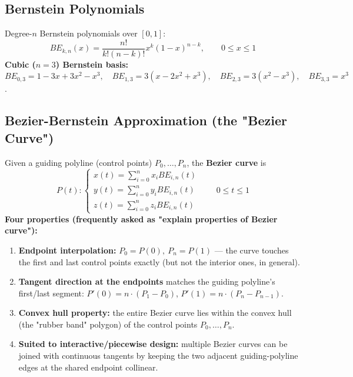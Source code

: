 \documentclass[12pt, a4paper]{article}
\newenvironment{answerbox}{\begin{mdframed}[style=answerframe]}{\end{mdframed}}
\begin{document}
\subsection{Bernstein Polynomials}
\begin{answerbox}
Degree-$n$ Bernstein polynomials over $[0,1]$:
$$BE_{k,n}(x) = \frac{n!}{k!(n-k)!}x^k(1-x)^{n-k}, \qquad 0\le x\le1$$
\textbf{Cubic ($n=3$) Bernstein basis:} $BE_{0,3}=1-3x+3x^2-x^3,\quad BE_{1,3}=3(x-2x^2+x^3),\quad BE_{2,3}=3(x^2-x^3),\quad BE_{3,3}=x^3$.
\end{answerbox}

\subsection{Bezier-Bernstein Approximation (the "Bezier Curve")}
\begin{answerbox}
Given a guiding polyline (control points) $P_0,\dots,P_n$, the \textbf{Bezier curve} is
$$P(t): \begin{cases}x(t)=\sum_{i=0}^{n}x_iBE_{i,n}(t)\\ y(t)=\sum_{i=0}^{n}y_iBE_{i,n}(t)\\ z(t)=\sum_{i=0}^{n}z_iBE_{i,n}(t)\end{cases} \qquad 0\le t\le1$$
\textbf{Four properties (frequently asked as "explain properties of Bezier curve"):}
\begin{enumerate}[noitemsep]
  \item \textbf{Endpoint interpolation:} $P_0=P(0),\ P_n=P(1)$ --- the curve touches the first and last control points exactly (but not the interior ones, in general).
  \item \textbf{Tangent direction at the endpoints} matches the guiding polyline's first/last segment: $P'(0)=n\cdot(P_1-P_0)$, $P'(1)=n\cdot(P_n-P_{n-1})$.
  \item \textbf{Convex hull property:} the entire Bezier curve lies within the convex hull (the "rubber band" polygon) of the control points $P_0,\dots,P_n$.
  \item \textbf{Suited to interactive/piecewise design:} multiple Bezier curves can be joined with continuous tangents by keeping the two adjacent guiding-polyline edges at the shared endpoint collinear.
\end{enumerate}
\end{answerbox}
\end{document}
